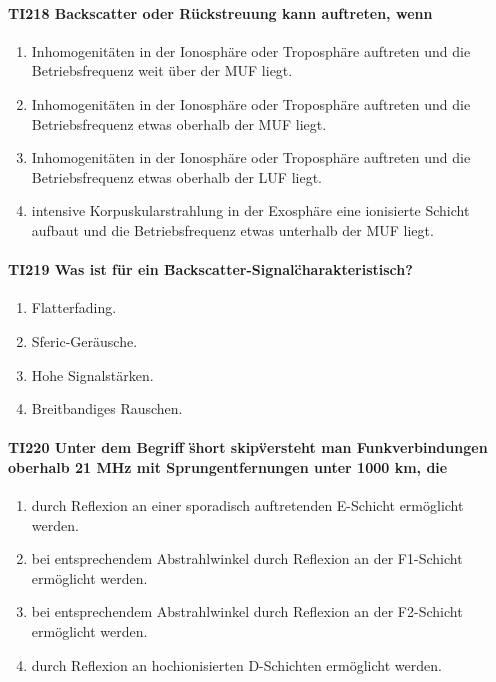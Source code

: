 \documentclass[8pt]{article}
\begin{document}
\paragraph*{TI218 Backscatter oder Rückstreuung kann auftreten, wenn} 
\begin{enumerate}[nolistsep,label=\Alph*]
\item Inhomogenitäten in der Ionosphäre oder Troposphäre auftreten und die Betriebsfrequenz weit über der MUF liegt.
\item Inhomogenitäten in der Ionosphäre oder Troposphäre auftreten und die Betriebsfrequenz etwas oberhalb der MUF liegt.
\item Inhomogenitäten in der Ionosphäre oder Troposphäre auftreten und die Betriebsfrequenz etwas oberhalb der LUF liegt.
\item intensive Korpuskularstrahlung in der Exosphäre eine ionisierte Schicht aufbaut und die Betriebsfrequenz etwas unterhalb der MUF liegt.
\end{enumerate}

\paragraph*{TI219 Was ist für ein \"Backscatter-Signal\" charakteristisch?} 
\begin{enumerate}[nolistsep,label=\Alph*]
\item Flatterfading.
\item Sferic-Geräusche.
\item Hohe Signalstärken.
\item Breitbandiges Rauschen.
\end{enumerate}

\paragraph*{TI220 Unter dem Begriff \"short skip\" versteht man Funkverbindungen oberhalb 21 MHz mit Sprungentfernungen unter 1000 km, die} 
\begin{enumerate}[nolistsep,label=\Alph*]
\item durch Reflexion an einer sporadisch auftretenden E-Schicht ermöglicht werden.
\item bei entsprechendem Abstrahlwinkel durch Reflexion an der F1-Schicht ermöglicht werden.
\item bei entsprechendem Abstrahlwinkel durch Reflexion an der F2-Schicht ermöglicht werden.
\item durch Reflexion an hochionisierten D-Schichten ermöglicht werden.
\end{enumerate}
\end{document}
